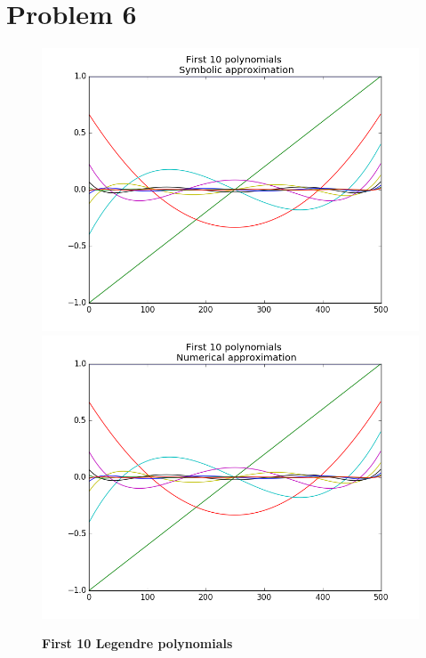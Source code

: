 \documentclass[a4paper,norsk]{article}
\begin{document}
\section*{Problem 6}
\begin{figure}[h!]
	\centering
	\caption*{\textbf{First 10 Legendre polynomials}}
	\includegraphics[scale=0.36]{sym10.png}
	\includegraphics[scale=0.36]{num10.png}
\end{figure}
\end{document}
